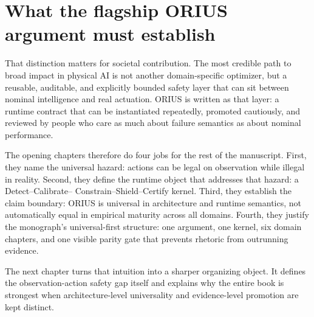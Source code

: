 \section{What the flagship ORIUS argument must establish}
That distinction matters for societal contribution.  The most credible path to broad
impact in physical AI is not another domain-specific optimizer, but a reusable,
auditable, and explicitly bounded safety layer that can sit between nominal intelligence
and real actuation.  ORIUS is written as that layer: a runtime contract that can be
instantiated repeatedly, promoted cautiously, and reviewed by people who care as much
about failure semantics as about nominal performance.

The opening chapters therefore do four jobs for the rest of the manuscript.  First, they name
the universal hazard: actions can be legal on observation while illegal in reality.
Second, they define the runtime object that addresses that hazard: a Detect--Calibrate--
Constrain--Shield--Certify kernel.  Third, they establish the claim boundary: ORIUS is
universal in architecture and runtime semantics, not automatically equal in empirical
maturity across all domains.  Fourth, they justify the monograph's universal-first
structure: one argument, one kernel, six domain chapters, and one visible parity gate
that prevents rhetoric from outrunning evidence.

The next chapter turns that intuition into a sharper organizing object.  It defines the
observation-action safety gap itself and explains why the entire book is strongest when
architecture-level universality and evidence-level promotion are kept distinct.
